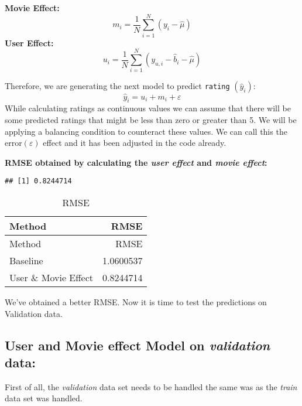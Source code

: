 \documentclass[
]{article}
\newenvironment{Shaded}{\begin{snugshade}}{\end{snugshade}}
\newcommand{\KeywordTok}[1]{\textcolor[rgb]{0.13,0.29,0.53}{\textbf{#1}}}
\newcommand{\NormalTok}[1]{#1}
\newcommand{\OperatorTok}[1]{\textcolor[rgb]{0.81,0.36,0.00}{\textbf{#1}}}
\newcommand{\StringTok}[1]{\textcolor[rgb]{0.31,0.60,0.02}{#1}}
\begin{document}
\textbf{Movie Effect:} \[m_i=\frac{1}{N}\sum_{i=1}^{N}(y_i-\hat{\mu})\]
\textbf{User Effect:}
\[u_i=\frac{1}{N}\sum_{i=1}^{N}(y_{u,i}-\hat{b}_i-\hat{\mu})\]

Therefore, we are generating the next model to predict \texttt{rating}
\((\hat{y}_i)\): \[\hat{y}_i=u_i+m_i+\varepsilon\] While calculating
ratings as continuous values we can assume that there will be some
predicted ratings that might be less than zero or greater than 5. We
will be applying a balancing condition to counteract these values. We
can call this the error\((\varepsilon)\) effect and it has been adjusted
in the code already.

\textbf{RMSE obtained by calculating the \emph{user effect} and
\emph{movie effect}:}

\begin{verbatim}
## [1] 0.8244714
\end{verbatim}

\begin{longtable}[]{@{}lr@{}}
\caption{RMSE}\tabularnewline
\toprule
Method & RMSE\tabularnewline
\midrule
\endfirsthead
\toprule
Method & RMSE\tabularnewline
\midrule
\endhead
Baseline & 1.0600537\tabularnewline
User \& Movie Effect & 0.8244714\tabularnewline
\bottomrule
\end{longtable}

We've obtained a better RMSE. Now it is time to test the predictions on
Validation data.\\
\newpage

\hypertarget{user-and-movie-effect-model-on-validation-data}{%
\subsection{\texorpdfstring{\textbf{User and Movie effect Model on
\emph{validation}
data:}}{User and Movie effect Model on validation data:}}\label{user-and-movie-effect-model-on-validation-data}}

First of all, the \emph{validation} data set needs to be handled the
same was as the \emph{train} data set was handled.

\begin{Shaded}
\end{Shaded}
\end{document}
